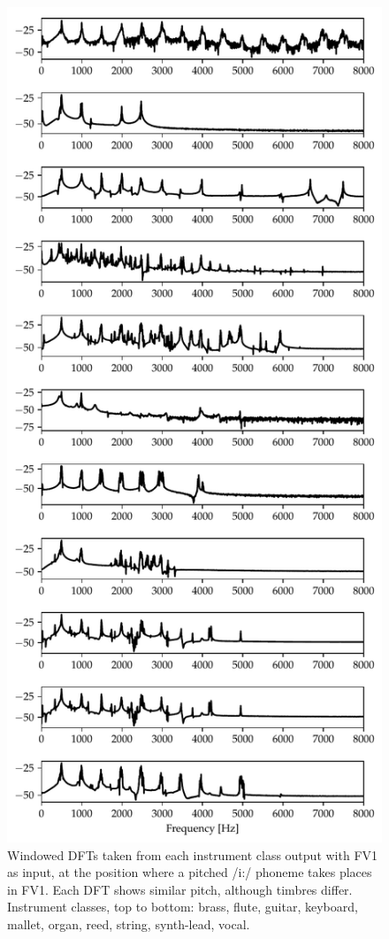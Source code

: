 \begin{figure}
	\centering
	\includegraphics[width=0.8\linewidth]{img/audioXsynth/plots/vox_to_magenta/all-dft-pos2}
	\caption{Windowed DFTs taken from each instrument class output with FV1 as input, at the position where a pitched /i:/ phoneme takes places in FV1. Each DFT shows similar pitch, although timbres differ. Instrument classes, top to bottom: brass, flute, guitar, keyboard, mallet, organ, reed, string, synth-lead, vocal.}
	\label{fig:all-dft-pos2}
\end{figure}



